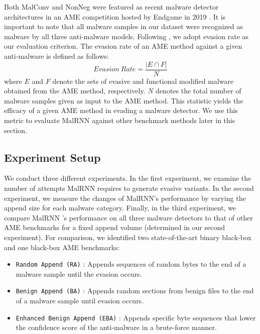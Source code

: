 \documentclass[letterpaper]{article}
\newcommand{\malrnn}{M\lowercase{a}lRNN }
\begin{document}
Both MalConv and NonNeg were featured as recent malware detector architectures in an AME competition hosted by Endgame in 2019 \cite{anderson_machine_2019}. It is important to note that all malware samples in our dataset were recognized as malware by all three anti-malware models. Following \cite{fleshman2019non,anderson2018learning}, we adopt evasion rate as our evaluation criterion. The evasion rate of an AME method against a given anti-malware is defined as follows:
\begin{equation}
  Evasion\ Rate = \frac{|E\cap F|}{N}
\end{equation}
where $E$ and $F$ denote the sets of evasive and functional modified malware obtained from the AME method, respectively. $N$ denotes the total number of malware samples given as input to the AME method. This statistic yields the efficacy of a given AME method in evading a malware detector. We use this metric to evaluate \malrnn against other benchmark methods later in this section.

\subsection{Experiment Setup}
\label{experiment_setup}
We conduct three different experiments. In the first experiment, we examine the number of attempts \malrnn requires to generate evasive variants. In the second experiment, we measure the changes of MalRNN's performance by varying the append size for each malware category. Finally, in the third experiment, we compare \malrnn's performance on all three malware detectors to that of other AME benchmarks for a fixed append volume (determined in our second experiment). For comparison, we identified two state-of-the-art binary black-box and one black-box AME benchmarks:

 \begin{itemize}
    \item{\verb|Random Append (RA)|} \cite{suciu2019exploring,castroandschmitt2019armed}: Appends sequences of random bytes to the end of a malware sample until the evasion occurs.
    \item{\verb|Benign Append (BA)|} \cite{castroandbiggio2019poster}: Appends random sections from benign files to the end of a malware sample until evasion occurs.
    \item{\verb|Enhanced Benign Append (EBA)|} \cite{chenB2019adversarial}: Appends specific byte sequences that lower the confidence score of the anti-malware in a brute-force manner.
\end{itemize}
\end{document}
